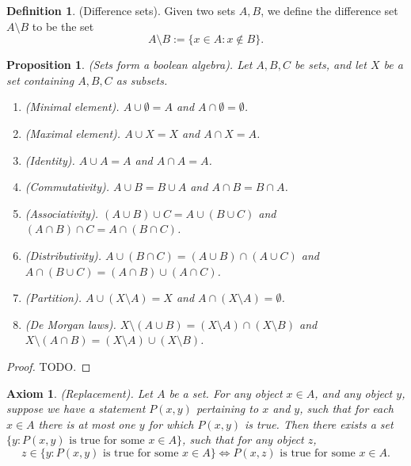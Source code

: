 \documentclass[12pt]{article}
\newtheorem{proposition}[theorem]{Proposition}
\newtheorem{axiom}[theorem]{Axiom}
\theoremstyle{definition}
\newtheorem{definition}[theorem]{Definition}
\theoremstyle{remark}
\begin{document}
\begin{definition}
    (Difference sets). Given two sets $A, B$, we define the difference set $A \setminus B$ to be the set \[
        A \setminus B := \{x \in A \colon x \not\in B\} 
    .\]
\end{definition}

\begin{proposition}
    (Sets form a boolean algebra). Let $A, B, C$ be sets, and let $X$ be a set containing $A, B, C$ as subsets.
    \begin{enumerate}
        \item (Minimal element). $A \cup \emptyset = A$ and $A \cap \emptyset = \emptyset$.
        \item (Maximal element). $A \cup X = X$ and $A \cap X = A$.
        \item (Identity). $A \cup A = A$ and $A \cap A = A$.
        \item (Commutativity). $A \cup B = B \cup A$ and $A \cap B = B \cap A$.
        \item (Associativity). $(A \cup B) \cup C = A \cup (B \cup C)$ and $(A \cap B) \cap C = A \cap (B \cap C)$.
        \item (Distributivity). $A \cup (B \cap C) = (A \cup B) \cap (A \cup C)$ and $A \cap (B \cup C) = (A \cap B) \cup (A \cap C)$.
        \item (Partition). $A \cup (X \setminus A) = X$ and $A \cap (X \setminus A) = \emptyset$.
        \item (De Morgan laws). $X \setminus (A \cup B) = (X \setminus A) \cap (X \setminus B)$ and $X \setminus (A \cap B) = (X \setminus A) \cup (X \setminus B)$.
    \end{enumerate}
\end{proposition}

\begin{proof}
    TODO.
\end{proof}

\begin{axiom}
    (Replacement). Let $A$ be a set. For any object $x \in A$, and any object $y$, suppose we have a statement $P(x, y)$ pertaining to $x$ and $y$, such that for each $x \in A$ there is at most one $y$ for which $P(x, y)$ is true. Then there exists a set $\{y \colon P(x, y) \text{ is true for some } x \in A\}$, such that for any object $z$, \[
        z \in \{y \colon P(x, y) \text{ is true for some } x \in A\} \iff P(x, z) \text{ is true for some } x \in A
    .\]
\end{axiom}
\end{document}
